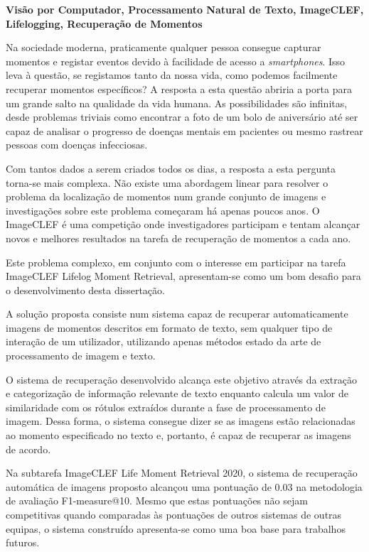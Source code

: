 \TitlePage
  \vspace*{55mm}
       {\textbf{Visão por Computador, Processamento Natural de Texto, ImageCLEF, Lifelogging, Recuperação de Momentos}}

          
      {Na sociedade moderna, praticamente qualquer pessoa consegue capturar momentos e registar eventos devido à facilidade de acesso a \textit{smartphones}. Isso leva à questão, se registamos tanto da nossa vida, como podemos facilmente recuperar momentos específicos? A resposta a esta questão abriria a porta para um grande salto na qualidade da vida humana. As possibilidades são infinitas, desde problemas triviais como encontrar a foto de um bolo de aniversário até ser capaz de analisar o progresso de doenças mentais em pacientes ou mesmo rastrear pessoas com doenças infecciosas.}

     \TEXT{}
     {Com tantos dados a serem criados todos os dias, a resposta a esta pergunta torna-se mais complexa. Não existe uma abordagem linear para resolver o problema da localização de momentos num grande conjunto de imagens e investigações sobre este problema começaram há apenas poucos anos. O ImageCLEF é uma competição onde investigadores participam e tentam alcançar novos e melhores resultados na tarefa de recuperação de momentos a cada ano.}

     \TEXT{}
     {Este problema complexo, em conjunto com o interesse em participar na tarefa ImageCLEF Lifelog Moment Retrieval, apresentam-se como um bom desafio para o desenvolvimento desta dissertação.}

     \TEXT{}
     {A solução proposta consiste num sistema capaz de recuperar automaticamente imagens de momentos descritos em formato de texto, sem qualquer tipo de interação de um utilizador, utilizando apenas métodos estado da arte de processamento de imagem e texto.} 

     \TEXT{}
     {O sistema de recuperação desenvolvido alcança este objetivo através da extração e categorização de informação relevante de texto enquanto calcula um valor de similaridade com os rótulos extraídos durante a fase de processamento de imagem. Dessa forma, o sistema consegue dizer se as imagens estão relacionadas ao momento especificado no texto e, portanto, é capaz de recuperar as imagens de acordo.
     }

     \TEXT{}
     {Na subtarefa ImageCLEF Life Moment Retrieval 2020, o sistema de recuperação automática de imagens proposto alcançou uma pontuação de 0.03 na metodologia de avaliação F1-measure@10. Mesmo que estas pontuações não sejam competitivas quando comparadas às pontuações de outros sistemas de outras equipas, o sistema construído apresenta-se como uma boa base para trabalhos futuros.}


